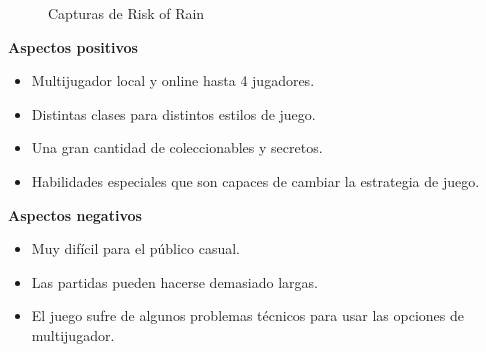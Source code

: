 \begin{figure}[H]
\begin{minipage}{0.43\textwidth}
        \label{RoR-Personajes}
    \end{minipage}
    \caption{Capturas de Risk of Rain}
\end{figure}

\textbf{Aspectos positivos}
\begin{itemize}
    \item Multijugador local y online hasta 4 jugadores.
    \item Distintas clases para distintos estilos de juego.
    \item Una gran cantidad de coleccionables y secretos.
    \item Habilidades especiales que son capaces de cambiar la estrategia de juego.
\end{itemize}

\textbf{Aspectos negativos}
\begin{itemize}
    \item Muy difícil para el público casual.
    \item Las partidas pueden hacerse demasiado largas.
    \item El juego sufre de algunos problemas técnicos para usar las opciones de multijugador.
\end{itemize}